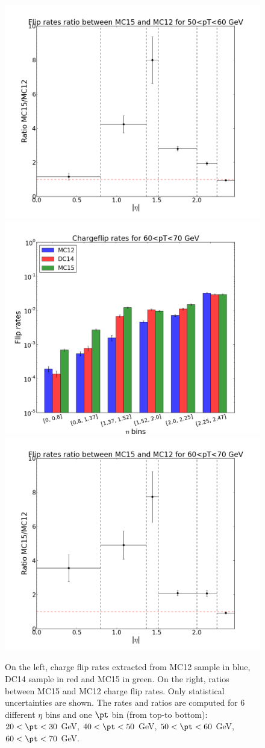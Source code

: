 \begin{figure}[!htbp]
\includegraphics[width=0.33\linewidth]{FIGURES/BKG/chargeFlip/APPENDIX/ratio_MC15vsMC12/ratio_plot_50.png}
\vfill
\includegraphics[width=0.33\linewidth]{FIGURES/BKG/chargeFlip/APPENDIX/fliprates_MC12/fliprates_3samples_60.png}
\includegraphics[width=0.33\linewidth]{FIGURES/BKG/chargeFlip/APPENDIX/ratio_MC15vsMC12/ratio_plot_60.png}
\caption{\label{fig:12vs15_2030} On the left, charge flip rates extracted from MC12 sample in blue, DC14 sample in red and MC15 in green. On the right, ratios between MC15 and MC12 charge flip rates. Only statistical uncertainties are shown. The rates and ratios are computed for 6 different $\eta$ bins and one $\pt$ bin (from top-to bottom): $20<\pt<30$ GeV, $40<\pt<50$ GeV, $50<\pt<60$ GeV, $60<\pt<70$ GeV.}
\end{figure}

